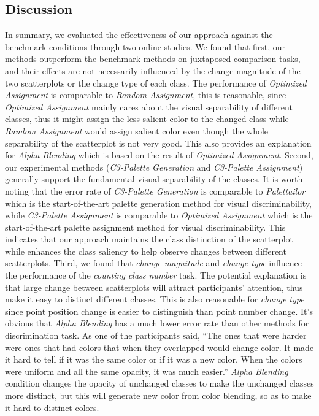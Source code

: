 \subsection{Discussion}
In summary, we evaluated the effectiveness of our approach against the benchmark conditions through two online studies.
We found that first, our methods outperform the benchmark methods on juxtaposed comparison tasks, and their effects are not necessarily influenced by the change magnitude of the two scatterplots or the change type of each class.
The performance of \emph{Optimized Assignment} is comparable to \emph{Random Assignment}, this is reasonable, since \emph{Optimized Assignment} mainly cares about the visual separability of different classes, thus it might assign the less salient color to the changed class while \emph{Random Assignment} would assign salient color even though the whole separability of the scatterplot is not very good. This also provides an explanation for \emph{Alpha Blending} which is based on the result of \emph{Optimized Assignment}.
Second, our experimental methods (\emph{C3-Palette Generation} and \emph{C3-Palette Assignment}) generally support the fundamental visual separability of the classes. It is worth noting that the error rate of \emph{C3-Palette Generation} is comparable to \emph{Palettailor} which is the start-of-the-art palette generation method for visual discriminability, while \emph{C3-Palette Assignment} is comparable to \emph{Optimized Assignment} which is the start-of-the-art palette assignment method for visual discriminability. This indicates that our approach maintains the class distinction of the scatterplot while enhances the class saliency to help observe changes between different scatterplots.
Third, we found that \emph{change magnitude} and \emph{change type} influence the performance of the \emph{counting class number} task. The potential explanation is that large change between scatterplots will attract participants' attention, thus make it easy to distinct different classes. This is also reasonable for \emph{change type} since point position change is easier to distinguish than point number change.
It's obvious that \emph{Alpha Blending} has a much lower error rate than other methods for discrimination task. As one of the participants said, ``The ones that were harder were ones that had colors that when they overlapped would change color. It made it hard to tell if it was the same color or if it was a new color. When the colors were uniform and all the same opacity, it was much easier.'' \emph{Alpha Blending} condition changes the opacity of unchanged classes to make the unchanged classes more distinct, but this will generate new color from color blending, so as to make it hard to distinct colors.

